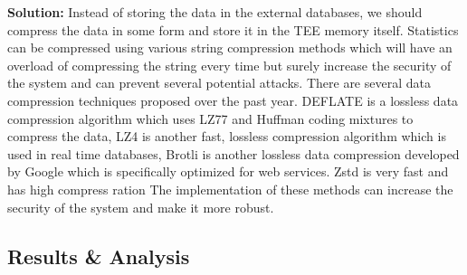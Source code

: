 \begin{enumerate}
	\textbf{Solution:} Instead of storing the data in the external databases, we should compress the data in some form and store it in the TEE memory itself. Statistics can be compressed using various string compression methods which will have an overload of compressing the string every time but surely increase the security of the system and can prevent several potential attacks. There are several data compression techniques proposed over the past year. DEFLATE\cite{sec5} is a lossless data compression algorithm which uses LZ77 and Huffman coding mixtures to compress the data, LZ4\cite{sec4} is another fast, lossless compression algorithm which is used in real time databases, Brotli\cite{sec2} is another lossless data compression developed by Google which is specifically optimized for web services. Zstd\cite{sec3} is very fast and has high compress ration The implementation of these methods can increase the security of the system and make it more robust.


\end{enumerate}

\subsection{Results \& Analysis}

